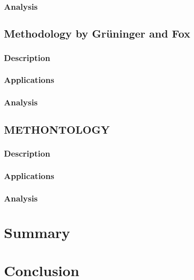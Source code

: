 \subsubsection{Analysis}

\subsection{Methodology by Grüninger and Fox}
\label{subsec:approach4}

\subsubsection{Description}

\subsubsection{Applications}

\subsubsection{Analysis}

\subsection{METHONTOLOGY}
\label{subsec:approach5}

\subsubsection{Description}

\subsubsection{Applications}

\subsubsection{Analysis}

\section{Summary}
\label{sec:approaches_summary}

\section{Conclusion}
\label{sec:approaches_conclusion}

